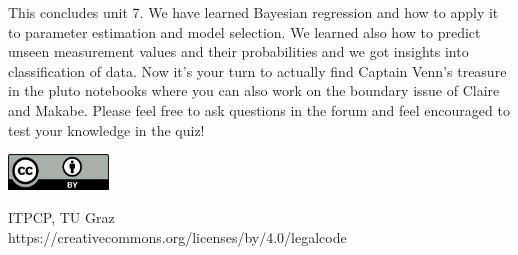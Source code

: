 \documentclass[12pt, a4paper]{scrartcl}
\begin{document}
This concludes unit 7. We have learned Bayesian regression and how to
apply it to parameter estimation and model selection. 
We learned also how to predict unseen measurement values and their probabilities and we got insights into classification of data.
Now it’s your turn to actually find Captain Venn’s treasure in the pluto
notebooks where you can also work on the boundary issue of Claire and
Makabe.
Please feel free to ask questions in the forum and feel encouraged to test your
knowledge in the quiz!


\vspace{2cm}
\begin{minipage}[t]{1\textwidth}
	\raggedleft
	\centering
	\includegraphics[width = 0.20\textwidth]{CC-BY_icon}
	\vspace{0.2cm}
	
	\centering
	{\large ITPCP, TU Graz} \\
	https://creativecommons.org/licenses/by/4.0/legalcode
\end{minipage}
\end{document}
